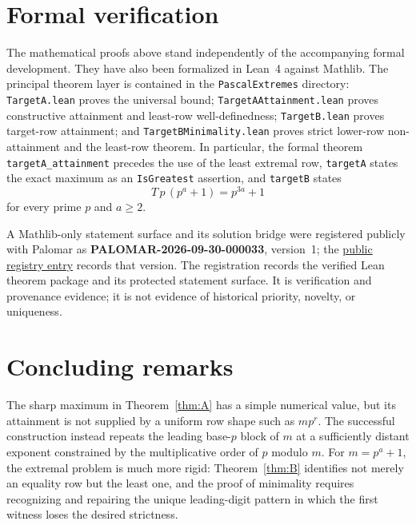 \documentclass[11pt]{article}
\theoremstyle{definition}
\theoremstyle{remark}
\begin{document}
\section{Formal verification}\label{sec:formal}

The mathematical proofs above stand independently of the accompanying formal development. They have also been formalized in Lean~4 against Mathlib. The principal theorem layer is contained in the \texttt{PascalExtremes} directory: \texttt{TargetA.lean} proves the universal bound; \texttt{TargetAAttainment.lean} proves constructive attainment and least-row well-definedness; \texttt{TargetB.lean} proves target-row attainment; and \texttt{TargetBMinimality.lean} proves strict lower-row non-attainment and the least-row theorem. In particular, the formal theorem \texttt{targetA\_attainment} precedes the use of the least extremal row, \texttt{targetA} states the exact maximum as an \texttt{IsGreatest} assertion, and \texttt{targetB} states
\[
  T\,p\,(p^a+1)=p^{3a}+1
\]
for every prime $p$ and $a\ge2$.

A Mathlib-only statement surface and its solution bridge were registered publicly with Palomar as \textbf{PALOMAR-2026-09-30-000033}, version~1; the \href{https://palomar-registry.org/entry.html?id=PALOMAR-2026-09-30-000033\&version=1}{public registry entry} records that version. The registration records the verified Lean theorem package and its protected statement surface. It is verification and provenance evidence; it is not evidence of historical priority, novelty, or uniqueness.

\section{Concluding remarks}

The sharp maximum in Theorem~\ref{thm:A} has a simple numerical value, but its attainment is not supplied by a uniform row shape such as $mp^r$. The successful construction instead repeats the leading base-$p$ block of $m$ at a sufficiently distant exponent constrained by the multiplicative order of $p$ modulo $m$. For $m=p^a+1$, the extremal problem is much more rigid: Theorem~\ref{thm:B} identifies not merely an equality row but the least one, and the proof of minimality requires recognizing and repairing the unique leading-digit pattern in which the first witness loses the desired strictness.


{\small

}
\end{document}

